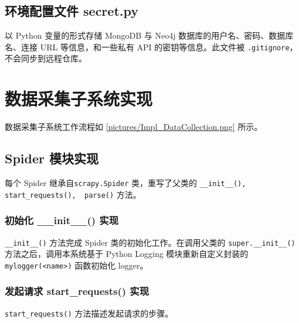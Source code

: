 \documentclass[a4paper,AutoFakeBold,oneside,12pt]{book}
\begin{document}
\subsection{环境配置文件 secret.py}

以 Python 变量的形式存储 MongoDB 与 Neo4j 数据库的用户名、密码、数据库名、连接 URL 等信息，和一些私有 API 的密钥等信息。此文件被 \lstinline|.gitignore|，不会同步到远程仓库。

\section{数据采集子系统实现}

数据采集子系统工作流程如 \ref{pictures/Impl_DataCollection.png} 所示。


\subsection{Spider 模块实现}

每个 Spider 继承自\lstinline[style = python]|scrapy.Spider| 类，重写了父类的 \lstinline[style = python]|__init__(), start_requests(),  parse()| 方法。

\subsubsection{初始化 {\_\_}init{\_\_}() 实现}

\lstinline[style = python]|__init__()| 方法完成 Spider 类的初始化工作。在调用父类的 \lstinline|super.__init__()| 方法之后，调用本系统基于 Python Logging 模块重新自定义封装的 \lstinline[style = python]|mylogger(<name>)| 函数初始化 logger。

\subsubsection{发起请求 start{\_}requests() 实现}
\lstinline[style = python]|start_requests()| 方法描述发起请求的步骤。
\end{document}
